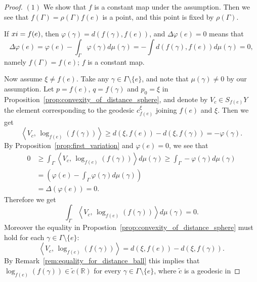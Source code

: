 \documentclass[12pt]{amsart}
\numberwithin{equation}{section}
\theoremstyle{plain}
\theoremstyle{definition}
\theoremstyle{remark}
\newcommand{\R}{{\mathbb R}}
\newcommand{\tcprj}{\log}
\newcommand{\inner}[2]{\left\langle #1,\, #2 \right\rangle}
\newcommand{\cc}[2]{c_{#1}^{#2}}
\begin{document}
\begin{proof}
$(1)$ We show that $f$ is a constant map under the assumption.
Then we see that $f(\Gamma)=\rho(\Gamma)f(e)$ is a point, and this point
 is fixed by $\rho(\Gamma)$.

If $\\xi=f(e)$, then
$\varphi(\gamma)=d(f(\gamma),f(e))$, 
and $\Delta \varphi(e)=0$ means that 
\begin{equation*}
 \Delta \varphi(e)= 
 \varphi(e)- \int_{\Gamma}\varphi(\gamma)d\mu(\gamma)
 = - \int d(f(\gamma), f(e)) d\mu(\gamma)= 0, 
\end{equation*}
 namely $f(\Gamma)=f(e)$; $f$ is a constant map.

Now assume $\xi\not= f(e)$. 
Take any $\gamma \in \Gamma\setminus \{e\}$, and note that
$\mu(\gamma)\not=0$ by our assumption. 
Let $p=f(e)$, $q=f(\gamma)$ and $p_0=\xi$ in 
Proposition~\ref{prop:convexity_of_distance_sphere}, 
and denote by $V_c \in S_{f(e)}Y$ the element corresponding to the
 geodesic $\cc{f(e)}{\xi}$ joining $f(e)$ and $\xi$. 
Then we get
\begin{equation*}
 \inner{V_c}{\tcprj_{f(e)}(f(\gamma))}
\geq d(\xi, f(e)) - d(\xi, f(\gamma))= -\varphi(\gamma). 
\end{equation*}
By Proposition~\ref{prop:first_variation} and 
$\varphi(e)=0$, we see that 
\begin{equation*}
\begin{split}
0 & \geq \int_{\Gamma} \inner{V_c}{\tcprj_{f(e)}(f(\gamma))}
d\mu (\gamma) 
\geq \int_{\Gamma} -\varphi(\gamma) d\mu (\gamma) \\
& = \left(
   \varphi(e) - \int_{\Gamma} \varphi(\gamma) d\mu(\gamma)
  \right) \\
& = \Delta (\varphi(e))=0.
\end{split}
\end{equation*}
Therefore we get
\begin{equation*}
\int_{\Gamma} \inner{V_c}{\tcprj_{f(e)}(f(\gamma))}
d\mu(\gamma)=0. 
\end{equation*}
Moreover the equality in
Propostion~\ref{prop:convexity_of_distance_sphere} must hold 
for each $\gamma \in \Gamma\setminus \{e\}$:
 \begin{equation}
 \label{eq:on_the_same_side}
  \inner{V_c}{\tcprj_{f(e)}(f(\gamma))} = d(\xi,f(e))-d(\xi,f(\gamma)). 
 \end{equation}
By Remark~\ref{rem:equality_for_distance_ball} this implies that
$\tcprj_{f(e)}(f(\gamma)) \in \tilde c(\R)$ for every 
$\gamma \in \Gamma\setminus \{e\}$, where $\tilde c$ is a geodesic in

\end{proof}
\end{document}
